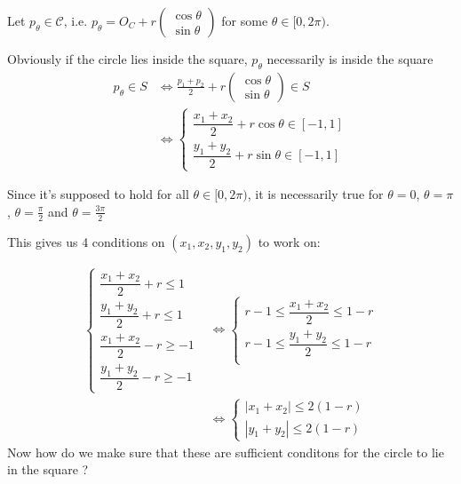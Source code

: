 \documentclass[11pt,a4paper]{article}
\theoremstyle{plain}
\theoremstyle{remark}
\begin{document}
Let $p_\theta \in \mathcal{C}$, i.e. $p_\theta = O_C + r\begin{pmatrix}\cos\theta\\ \sin\theta\end{pmatrix}$ for some $\theta \in [0, 2\pi)$.

Obviously if the circle lies inside the square, $p_\theta$ necessarily is inside the square
\begin{align*}
    p_\theta \in S
    &\iff
    \frac{p_1 + p_2}{2} + r \begin{pmatrix}\cos\theta \\ \sin\theta \end{pmatrix} \in S
    \\
    &\iff
    \begin{cases}
        \dfrac{x_1 + x_2}{2} + r \cos \theta \in [-1, 1] \\[6pt]
        \dfrac{y_1 + y_2}{2} + r \sin \theta \in [-1, 1]
    \end{cases}
\end{align*}

Since it's supposed to hold for all $\theta \in [0, 2\pi)$, it is necessarily true for $\theta = 0$, $\theta = \pi$, $\theta = \frac{\pi}{2}$ and $\theta = \frac{3\pi}{2}$

This gives us 4 conditions on $(x_1, x_2, y_1, y_2)$ to work on:

\begin{align*}
    \begin{cases}
        \dfrac{x_1 + x_2}{2} + r  \leq 1 \\[6pt]
        \dfrac{y_1 + y_2}{2} + r  \leq 1 \\[6pt]
        \dfrac{x_1 + x_2}{2} - r  \geq -1 \\[6pt]
        \dfrac{y_1 + y_2}{2} - r  \geq -1
    \end{cases}
    & \iff
    \begin{cases}
        r - 1 \leq \dfrac{x_1 + x_2}{2} \leq 1 - r \\[6pt]
        r - 1 \leq \dfrac{y_1 + y_2}{2} \leq 1 - r \\[6pt]
    \end{cases}
    \\[20pt]
    & \iff
    \begin{cases}
        |x_1 + x_2| \leq 2(1-r) \\
        |y_1 + y_2| \leq 2(1-r)
    \end{cases}
\end{align*}
Now how do we make sure that these are sufficient conditons for the circle to lie in the square ?
\end{document}
